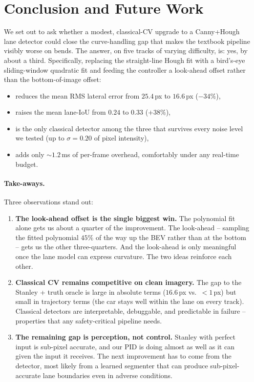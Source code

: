 \section{Conclusion and Future Work}
\label{sec:conclusion}

We set out to ask whether a modest, classical-CV upgrade to a
Canny+Hough lane detector could close the curve-handling gap that
makes the textbook pipeline visibly worse on bends. The answer, on
five tracks of varying difficulty, is: yes, by about a third.
Specifically, replacing the straight-line Hough fit with a bird's-eye
sliding-window quadratic fit and feeding the controller a look-ahead
offset rather than the bottom-of-image offset:
\begin{itemize}[leftmargin=1.4em,itemsep=2pt]
  \item reduces the mean RMS lateral error from $25.4$\,px to
        $16.6$\,px ($-34\%$),
  \item raises the mean lane-IoU from $0.24$ to $0.33$ ($+38\%$),
  \item is the only classical detector among the three that survives
        every noise level we tested (up to $\sigma=0.20$ of pixel
        intensity),
  \item adds only $\sim 1.2$\,ms of per-frame overhead, comfortably
        under any real-time budget.
\end{itemize}

\paragraph{Take-aways.}
Three observations stand out:
\begin{enumerate}[leftmargin=1.8em,itemsep=2pt]
  \item \textbf{The look-ahead offset is the single biggest win.} The
        polynomial fit alone gets us about a quarter of the
        improvement. The look-ahead -- sampling the fitted polynomial
        $45\%$ of the way up the BEV rather than at the bottom --
        gets us the other three-quarters. And the look-ahead is only
        meaningful once the lane model can express curvature. The two
        ideas reinforce each other.
  \item \textbf{Classical CV remains competitive on clean imagery.}
        The gap to the Stanley + truth oracle is large in absolute
        terms ($16.6$\,px vs.\ $<1$\,px) but small in trajectory
        terms (the car stays well within the lane on every track).
        Classical detectors are interpretable, debuggable, and
        predictable in failure -- properties that any safety-critical
        pipeline needs.
  \item \textbf{The remaining gap is perception, not control.}
        Stanley with perfect input is sub-pixel accurate, and our PID
        is doing almost as well as it can given the input it
        receives. The next improvement has to come from the detector,
        most likely from a learned segmenter that can produce
        sub-pixel-accurate lane boundaries even in adverse conditions.
\end{enumerate}

